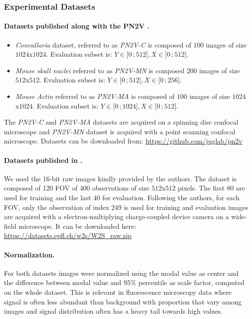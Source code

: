 \documentclass{article}
\newcommand{\interval}[2]{\mathopen{[}#1\,;#2\mathclose{]}}
\begin{document}
\subsubsection{Experimental Datasets}
\label{si:datasetxp}
\paragraph{Datasets published along with the PN2V \cite{krull2019probabilistic}.}
\begin{itemize}
  \item \emph{Convallaria} dataset, referred to as \emph{PN2V-C} is composed of 100 images of size $1024$x$1024$. Evaluation subset is: $Y\in\interval{0}{512}, X\in\interval{0}{512}$.
  \item \emph{Mouse skull nuclei} referred to as \emph{PN2V-MN} is composed 200 images of size $512$x$512$. Evaluation subset is: $Y\in\interval{0}{512}, X\in\interval{0}{256}$.
  \item \emph{Mouse Actin} referred to as \emph{PN2V-MA} is composed of 100 images of size $1024$x$1024$. Evaluation subset is: $Y\in\interval{0}{1024}, X\in\interval{0}{512}$.
\end{itemize}

The \emph{PN2V-C} and \emph{PN2V-MA} datasets are acquired on a spinning disc confocal microscope and \emph{PN2V-MN} dataset is acquired with a point scanning confocal microscope.
Datasets can be downloaded from: \url{https://github.com/juglab/pn2v}

\paragraph{Datasets published in \cite{zhou2020w2s}.}

We used the 16-bit raw images kindly provided by the authors.
The dataset is composed of 120 FOV of 400 observations of size $512$x$512$ pixels.
The first 80 are used for training and the last 40 for evaluation.
Following the authors, for each FOV, only the observation of index 249 is used for training and evaluation
images are acquired with a electron-multiplying charge-coupled device camera on a wide-field microscope.
It can be downloaded here: \url{https://datasets.epfl.ch/w2s/W2S_raw.zip}

\paragraph{Normalization.}

For both datasets images were normalized using the modal value as center and the difference between modal value and $95\%$ percentile as scale factor, computed on the whole dataset.
This is relevant in fluorescence microscopy data where signal is often less abundant than background with proportion that vary among images and signal distribution often has a heavy tail towards high values.
\end{document}
